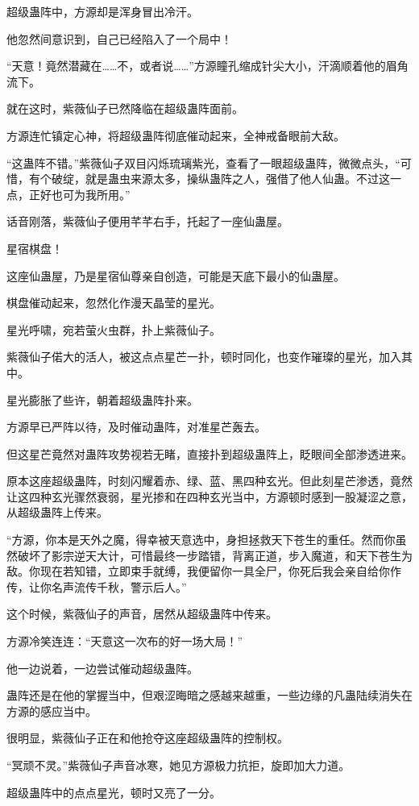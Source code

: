 \begin{this_body}
超级蛊阵中，方源却是浑身冒出冷汗。

他忽然间意识到，自己已经陷入了一个局中！

“天意！竟然潜藏在……不，或者说……”方源瞳孔缩成针尖大小，汗滴顺着他的眉角流下。

就在这时，紫薇仙子已然降临在超级蛊阵面前。

方源连忙镇定心神，将超级蛊阵彻底催动起来，全神戒备眼前大敌。

“这蛊阵不错。”紫薇仙子双目闪烁琉璃紫光，查看了一眼超级蛊阵，微微点头，“可惜，有个破绽，就是蛊虫来源太多，操纵蛊阵之人，强借了他人仙蛊。不过这一点，正好也可为我所用。”

话音刚落，紫薇仙子便用芊芊右手，托起了一座仙蛊屋。

星宿棋盘！

这座仙蛊屋，乃是星宿仙尊亲自创造，可能是天底下最小的仙蛊屋。

棋盘催动起来，忽然化作漫天晶莹的星光。

星光呼啸，宛若萤火虫群，扑上紫薇仙子。

紫薇仙子偌大的活人，被这点点星芒一扑，顿时同化，也变作璀璨的星光，加入其中。

星光膨胀了些许，朝着超级蛊阵扑来。

方源早已严阵以待，及时催动蛊阵，对准星芒轰去。

但这星芒竟然对蛊阵攻势视若无睹，直接扑到超级蛊阵上，眨眼间全部渗透进来。

原本这座超级蛊阵，时刻闪耀着赤、绿、蓝、黑四种玄光。但此刻星芒渗透，竟然让这四种玄光骤然衰弱，星光掺和在四种玄光当中，方源顿时感到一股凝涩之意，从超级蛊阵上传来。

“方源，你本是天外之魔，得幸被天意选中，身担拯救天下苍生的重任。然而你虽然破坏了影宗逆天大计，可惜最终一步踏错，背离正道，步入魔道，和天下苍生为敌。你现在若知错，立即束手就缚，我便留你一具全尸，你死后我会亲自给你作传，让你名声流传千秋，警示后人。”

这个时候，紫薇仙子的声音，居然从超级蛊阵中传来。

方源冷笑连连：“天意这一次布的好一场大局！”

他一边说着，一边尝试催动超级蛊阵。

蛊阵还是在他的掌握当中，但艰涩晦暗之感越来越重，一些边缘的凡蛊陆续消失在方源的感应当中。

很明显，紫薇仙子正在和他抢夺这座超级蛊阵的控制权。

“冥顽不灵。”紫薇仙子声音冰寒，她见方源极力抗拒，旋即加大力道。

超级蛊阵中的点点星光，顿时又亮了一分。


\end{this_body}
